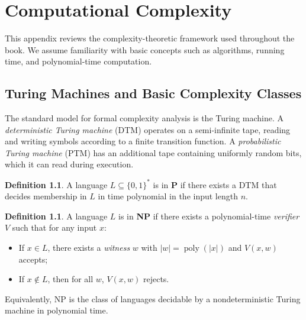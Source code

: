 \documentclass[twoside,12pt]{book}
\theoremstyle{plain}
\theoremstyle{definition}
\newtheorem{definition}[theorem]{Definition}
\theoremstyle{remark}
\begin{document}
\chapter{Computational Complexity}
\label{app:complexity}

This appendix reviews the complexity-theoretic framework used throughout
the book. We assume familiarity with basic concepts such as algorithms,
running time, and polynomial-time computation.

\section{Turing Machines and Basic Complexity Classes}
\label{app:sec:turing}

The standard model for formal complexity analysis is the Turing machine.
A \emph{deterministic Turing machine} (DTM) operates on a semi-infinite
tape, reading and writing symbols according to a finite transition function.
A \emph{probabilistic Turing machine} (PTM) has an additional tape
containing uniformly random bits, which it can read during execution.

\begin{definition}
A language $L \subseteq \{0,1\}^*$ is in \textbf{P} if there exists a DTM
that decides membership in $L$ in time polynomial in the input length $n$.
\end{definition}

\begin{definition}
A language $L$ is in \textbf{NP} if there exists a polynomial-time
\emph{verifier} $V$ such that for any input $x$:
\begin{itemize}
\item If $x \in L$, there exists a \emph{witness} $w$ with $|w| =
      \operatorname{poly}(|x|)$ and $V(x,w)$ accepts;
\item If $x \notin L$, then for all $w$, $V(x,w)$ rejects.
\end{itemize}
\end{definition}

Equivalently, NP is the class of languages decidable by a
nondeterministic Turing machine in polynomial time.
\end{document}
